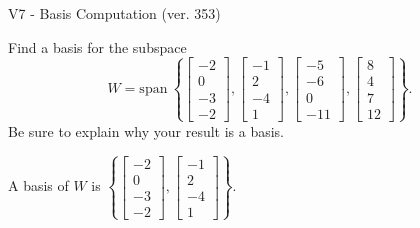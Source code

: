 \begin{exercise}
  \begin{exerciseTitle}V7 - Basis Computation (ver. 353)\end{exerciseTitle}
  \begin{exerciseStatement}
    Find a basis for the subspace 
\[W=\mathrm{span}\ \left\{\left[\begin{array}{r}
-2 \\
0 \\
-3 \\
-2
\end{array}\right] , \left[\begin{array}{r}
-1 \\
2 \\
-4 \\
1
\end{array}\right] , \left[\begin{array}{r}
-5 \\
-6 \\
0 \\
-11
\end{array}\right] , \left[\begin{array}{r}
8 \\
4 \\
7 \\
12
\end{array}\right]\right\}.\]
 Be sure to explain why your result is a basis.


  \end{exerciseStatement}
  \begin{exerciseAnswer}
   A basis of \(W\) is  \(\left\{\left[\begin{array}{r}
-2 \\
0 \\
-3 \\
-2
\end{array}\right] , \left[\begin{array}{r}
-1 \\
2 \\
-4 \\
1
\end{array}\right]\right\}\).
  


  \end{exerciseAnswer}
\end{exercise}